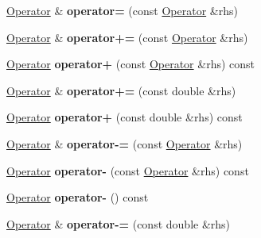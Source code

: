 \begin{DoxyCompactItemize}
\item 
\hyperlink{classOperator}{Operator} \& {\bfseries operator=} (const \hyperlink{classOperator}{Operator} \&rhs)\hypertarget{classOperator_afad114ba9dee8b9c08af0b5d27c3ba86}{}\label{classOperator_afad114ba9dee8b9c08af0b5d27c3ba86}

\item 
\hyperlink{classOperator}{Operator} \& {\bfseries operator+=} (const \hyperlink{classOperator}{Operator} \&rhs)\hypertarget{classOperator_a0b20b0fedb0f49c4a2e69507cdcb540b}{}\label{classOperator_a0b20b0fedb0f49c4a2e69507cdcb540b}

\item 
\hyperlink{classOperator}{Operator} {\bfseries operator+} (const \hyperlink{classOperator}{Operator} \&rhs) const \hypertarget{classOperator_a67d89d71379a609aa018178afe1adb8d}{}\label{classOperator_a67d89d71379a609aa018178afe1adb8d}

\item 
\hyperlink{classOperator}{Operator} \& {\bfseries operator+=} (const double \&rhs)\hypertarget{classOperator_a9a57611d543bbf50e21bd81f94925dab}{}\label{classOperator_a9a57611d543bbf50e21bd81f94925dab}

\item 
\hyperlink{classOperator}{Operator} {\bfseries operator+} (const double \&rhs) const \hypertarget{classOperator_ae725e82c115d39c8688df372e99c78e0}{}\label{classOperator_ae725e82c115d39c8688df372e99c78e0}

\item 
\hyperlink{classOperator}{Operator} \& {\bfseries operator-\/=} (const \hyperlink{classOperator}{Operator} \&rhs)\hypertarget{classOperator_a1235ee7e0ba5220a831ac0c01b2210b9}{}\label{classOperator_a1235ee7e0ba5220a831ac0c01b2210b9}

\item 
\hyperlink{classOperator}{Operator} {\bfseries operator-\/} (const \hyperlink{classOperator}{Operator} \&rhs) const \hypertarget{classOperator_ac25a9769a621623062b922cb9a40a489}{}\label{classOperator_ac25a9769a621623062b922cb9a40a489}

\item 
\hyperlink{classOperator}{Operator} {\bfseries operator-\/} () const \hypertarget{classOperator_aa06ee3d5828d7bc43b3aca693ac0ef25}{}\label{classOperator_aa06ee3d5828d7bc43b3aca693ac0ef25}

\item 
\hyperlink{classOperator}{Operator} \& {\bfseries operator-\/=} (const double \&rhs)\hypertarget{classOperator_a6e1ad8f778a9026e47493aaffbe1ca20}{}\label{classOperator_a6e1ad8f778a9026e47493aaffbe1ca20}


\end{DoxyCompactItemize}
